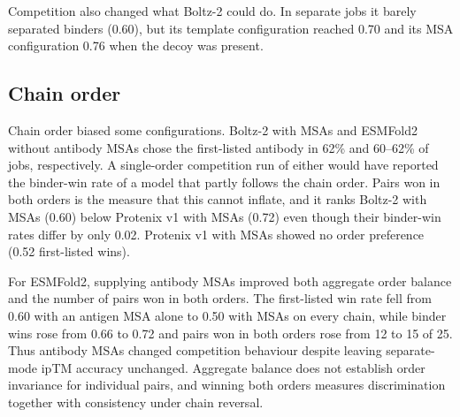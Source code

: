 \documentclass[11pt,a4paper]{article}
\begin{document}
Competition also changed what Boltz-2 could do.
In separate jobs it barely separated binders (0.60), but its template configuration reached 0.70 and its MSA configuration 0.76 when the decoy was present.

\subsection{Chain order}

Chain order biased some configurations.
Boltz-2 with MSAs and ESMFold2 without antibody MSAs chose the first-listed antibody in 62\% and 60--62\% of jobs, respectively.
A single-order competition run of either would have reported the binder-win rate of a model that partly follows the chain order.
Pairs won in both orders is the measure that this cannot inflate, and it ranks Boltz-2 with MSAs (0.60) below Protenix v1 with MSAs (0.72) even though their binder-win rates differ by only 0.02.
Protenix v1 with MSAs showed no order preference (0.52 first-listed wins).

For ESMFold2, supplying antibody MSAs improved both aggregate order balance and the number of pairs won in both orders.
The first-listed win rate fell from 0.60 with an antigen MSA alone to 0.50 with MSAs on every chain, while binder wins rose from 0.66 to 0.72 and pairs won in both orders rose from 12 to 15 of 25.
Thus antibody MSAs changed competition behaviour despite leaving separate-mode ipTM accuracy unchanged.
Aggregate balance does not establish order invariance for individual pairs, and winning both orders measures discrimination together with consistency under chain reversal.
\end{document}
